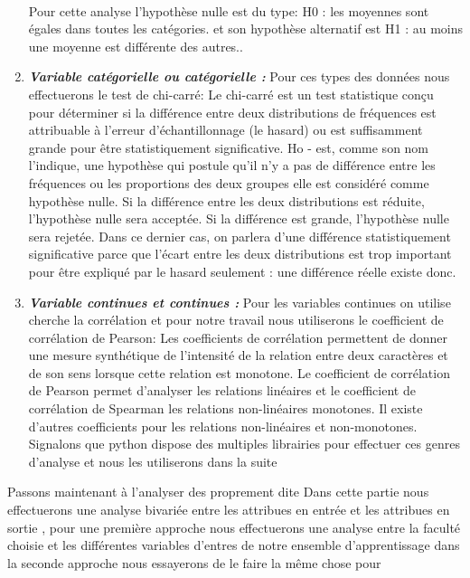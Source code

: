 \begin{enumerate}
	\paragraph{}
	Pour cette analyse l'hypothèse nulle est du type:
	H0 : les moyennes sont égales dans toutes les catégories. 
	et son hypothèse alternatif est 
	H1 : au moins une moyenne est différente des autres..
	\item \emph{\textbf{Variable catégorielle ou catégorielle  :}} 
	Pour ces types des données nous effectuerons le test de chi-carré: Le chi-carré est un test statistique conçu pour déterminer si la différence
	entre deux distributions de fréquences est attribuable à l'erreur
	d'échantillonnage (le hasard) ou est suffisamment grande pour être
	statistiquement significative.
	Ho - est, comme son nom l'indique, une hypothèse qui postule qu'il n'y a pas de différence entre les fréquences ou les proportions des deux groupes elle est considéré comme hypothèse nulle.
	Si la différence entre les deux distributions est réduite, l'hypothèse
	nulle sera acceptée. Si la différence est grande, l'hypothèse nulle sera
	rejetée. Dans ce dernier cas, on parlera d'une différence
	statistiquement significative parce que l'écart entre les deux
	distributions est trop important pour être expliqué par le hasard
	seulement : une différence réelle existe donc.
\item \emph{\textbf{Variable continues et continues  :}} 
Pour les variables continues on utilise cherche la corrélation et pour
notre travail nous utiliserons le coefficient de corrélation de
Pearson: Les coefficients de corrélation permettent de donner une mesure
synthétique de l'intensité de la relation entre deux caractères et de
son sens lorsque cette relation est monotone. Le coefficient de
corrélation de Pearson permet d'analyser les relations linéaires et le
coefficient de corrélation de Spearman les relations non-linéaires
monotones. Il existe d'autres coefficients pour les relations
non-linéaires et non-monotones.
Signalons que python dispose des multiples librairies pour effectuer ces
genres d'analyse et nous les utiliserons dans la suite
\end{enumerate}
Passons maintenant à l'analyser des proprement dite 
 Dans cette partie nous effectuerons une analyse bivariée
 entre les attribues en entrée et les attribues en sortie , pour une
 première approche nous effectuerons une analyse entre la faculté choisie
 et les différentes variables d'entres de notre ensemble d'apprentissage
 dans la seconde approche nous essayerons de le faire la même chose pour
